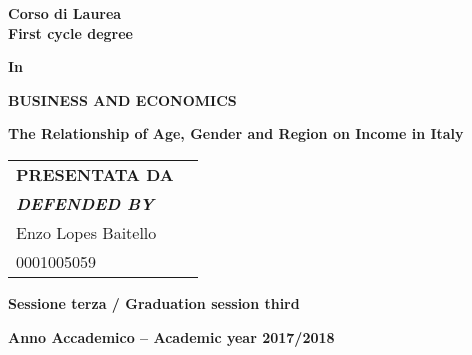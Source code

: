 \documentclass[
]{article}
\author{}
\date{}
\begin{document}
\begin{spacing}{2}

{
\centering
{}
}

\bigskip


\bigskip
\bigskip

\begin{spacing}{1.25}
\textbf{Corso di Laurea\\
First cycle degree}
\end{spacing}

\textbf{In}

\textbf{\large BUSINESS AND ECONOMICS}

\bigskip
\bigskip

\begin{spacing}{1.5}

\textbf{\LARGE The Relationship of Age, Gender and Region on Income in Italy}
\end{spacing}

\bigskip
\bigskip
\bigskip
\bigskip
\bigskip
\bigskip

\begin{longtable}[]{@{}
  >{\raggedright\arraybackslash}p{}
  >{\raggedright\arraybackslash}p{}@{}}
\endhead
\endlastfoot
\textbf{\large PRESENTATA DA } & \\
\textbf{\large  \emph{DEFENDED BY}} & \\
\large Enzo Lopes Baitello & \\
\large 0001005059 & \\
\end{longtable}

\vfill

\textbf{Sessione terza / Graduation session
third}

\clearpage

\textbf{Anno Accademico -- Academic year 2017/2018}

\end{spacing}
\end{document}
